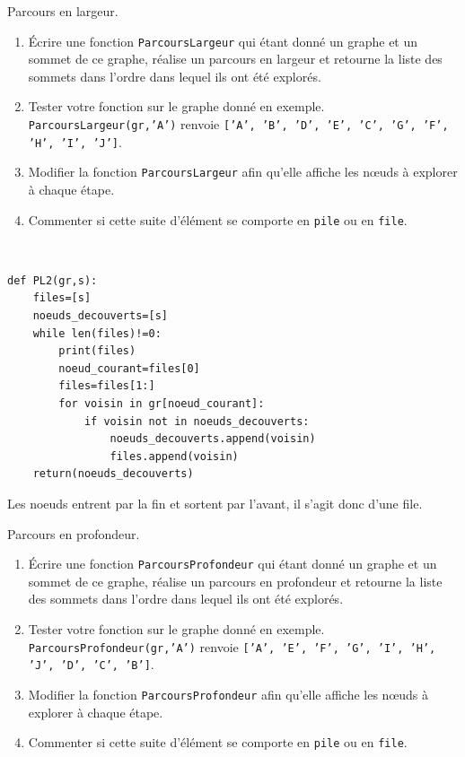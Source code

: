 \begin{exercice}Parcours en largeur.
\begin{enumerate}
\item Écrire une fonction \texttt{ParcoursLargeur} qui étant donné un graphe et un sommet de ce graphe, réalise un parcours en largeur et retourne la liste des sommets dans l'ordre dans lequel ils ont été explorés.
\item Tester votre fonction sur le graphe donné en exemple. \\
\texttt{ParcoursLargeur(gr,'A')} renvoie \texttt{['A', 'B', 'D', 'E', 'C', 'G', 'F', 'H', 'I', 'J']}.
\item Modifier la fonction \texttt{ParcoursLargeur} afin qu'elle affiche les n\oe uds à explorer à chaque étape.
\item Commenter si cette suite d'élément se comporte en \texttt{pile} ou en \texttt{file}.
\end{enumerate}
\end{exercice}

\begin{solution}~\
\begin{verbatim}
def PL2(gr,s):
    files=[s]
    noeuds_decouverts=[s]
    while len(files)!=0:
        print(files)
        noeud_courant=files[0]
        files=files[1:]
        for voisin in gr[noeud_courant]:
            if voisin not in noeuds_decouverts:
                noeuds_decouverts.append(voisin)
                files.append(voisin)
    return(noeuds_decouverts)    
\end{verbatim}
Les noeuds entrent par la fin et sortent par l'avant, il s'agit donc d'une file.
\end{solution}


\begin{exercice}Parcours en profondeur.
\begin{enumerate}
\item Écrire une fonction \texttt{ParcoursProfondeur} qui étant donné un graphe et un sommet de ce graphe, réalise un parcours en profondeur et retourne la liste des sommets dans l'ordre dans lequel ils ont été explorés.
\item Tester votre fonction sur le graphe donné en exemple. \\ \texttt{ParcoursProfondeur(gr,'A')} renvoie \texttt{['A', 'E', 'F', 'G', 'I', 'H', 'J', 'D', 'C', 'B']}.
\item Modifier la fonction \texttt{ParcoursProfondeur} afin qu'elle affiche les n\oe uds à explorer à chaque étape.
\item Commenter si cette suite d'élément se comporte en \texttt{pile} ou en \texttt{file}.
\end{enumerate}
\end{exercice}

